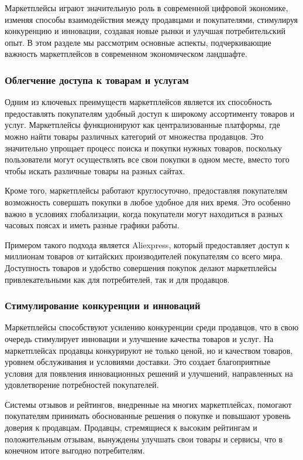 Маркетплейсы играют значительную роль в современной цифровой экономике, изменяя способы взаимодействия между продавцами и покупателями, стимулируя конкуренцию и инновации, создавая новые рынки и улучшая потребительский опыт. В этом разделе мы рассмотрим основные аспекты, подчеркивающие важность маркетплейсов в современном экономическом ландшафте.

\subsubsection{Облегчение доступа к товарам и услугам}
Одним из ключевых преимуществ маркетплейсов является их способность предоставлять покупателям удобный доступ к широкому ассортименту товаров и услуг. Маркетплейсы функционируют как централизованные платформы, где можно найти товары различных категорий от множества продавцов. Это значительно упрощает процесс поиска и покупки нужных товаров, поскольку пользователи могут осуществлять все свои покупки в одном месте, вместо того чтобы искать различные товары на разных сайтах.

Кроме того, маркетплейсы работают круглосуточно, предоставляя покупателям возможность совершать покупки в любое удобное для них время. Это особенно важно в условиях глобализации, когда покупатели могут находиться в разных часовых поясах и иметь разные графики работы.

Примером такого подхода является Aliexpress, который предоставляет доступ к миллионам товаров от китайских производителей покупателям со всего мира. Доступность товаров и удобство совершения покупок делают маркетплейсы привлекательными как для потребителей, так и для продавцов.

\subsubsection{Стимулирование конкуренции и инноваций}
Маркетплейсы способствуют усилению конкуренции среди продавцов, что в свою очередь стимулирует инновации и улучшение качества товаров и услуг. На маркетплейсах продавцы конкурируют не только ценой, но и качеством товаров, уровнем обслуживания и условиями доставки. Это создает благоприятные условия для появления инновационных решений и улучшений, направленных на удовлетворение потребностей покупателей.

Системы отзывов и рейтингов, внедренные на многих маркетплейсах, помогают покупателям принимать обоснованные решения о покупке и повышают уровень доверия к продавцам. Продавцы, стремящиеся к высоким рейтингам и положительным отзывам, вынуждены улучшать свои товары и сервисы, что в конечном итоге выгодно потребителям.

